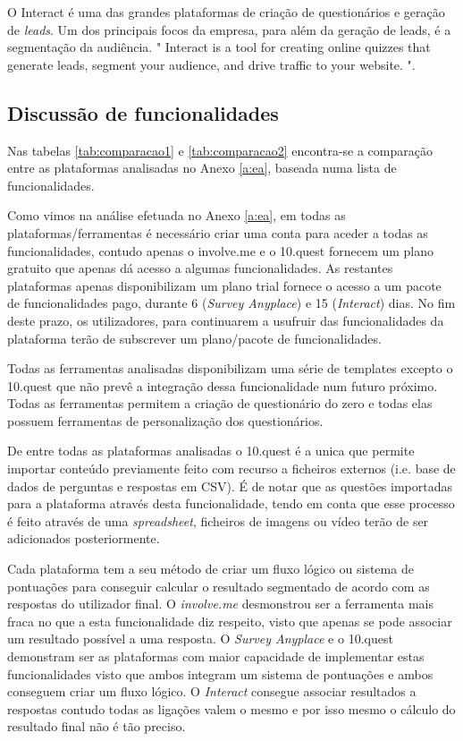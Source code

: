 O Interact é uma das grandes plataformas de criação de questionários e geração de \textit{leads}. Um dos principais focos da empresa, para além da geração de leads, é a segmentação da audiência. " Interact is a tool for creating online quizzes that generate leads, segment your audience, and drive traffic to your website. "\cite{interact}.


\subsection{Discussão de funcionalidades}
\label{comparacao}

Nas tabelas \ref{tab:comparacao1} e \ref{tab:comparacao2}  encontra-se a comparação entre as plataformas analisadas no Anexo \ref{a:ea}, baseada numa lista de funcionalidades.

Como vimos na análise efetuada no Anexo \ref{a:ea}, em todas as plataformas/ferramentas é necessário criar uma conta para aceder a todas as funcionalidades, contudo apenas o involve.me e o 10.quest fornecem um plano gratuito que apenas dá acesso a algumas funcionalidades. As restantes plataformas apenas disponibilizam um plano trial fornece o acesso a um pacote de funcionalidades pago, durante 6 (\textit{Survey Anyplace}) e 15 (\textit{Interact}) dias. No fim deste prazo, os utilizadores, para continuarem a usufruir das funcionalidades da plataforma terão de subscrever um plano/pacote de funcionalidades.

Todas as ferramentas analisadas disponibilizam uma série de templates excepto o 10.quest que não prevê a integração dessa funcionalidade num futuro próximo. Todas as ferramentas permitem a criação de questionário do zero e todas elas possuem ferramentas de personalização dos questionários.

De entre todas as plataformas analisadas o 10.quest é a unica que permite importar conteúdo previamente feito com recurso a ficheiros externos (i.e. base de dados de perguntas e respostas em CSV). É de notar que as questões importadas para a plataforma através desta funcionalidade, tendo em conta que esse processo é feito através de uma \textit{spreadsheet}, ficheiros de imagens ou vídeo terão de ser adicionados posteriormente.

Cada plataforma tem a seu método de criar um fluxo lógico ou sistema de pontuações para conseguir calcular o resultado segmentado de acordo com as respostas do utilizador final. O \textit{involve.me} desmonstrou ser a ferramenta mais fraca no que a esta funcionalidade diz respeito, visto que apenas se pode associar um resultado possível a uma resposta. O \textit{Survey Anyplace} e o 10.quest demonstram ser as plataformas com maior capacidade de implementar estas funcionalidades visto que ambos integram um sistema de pontuações e ambos conseguem criar um fluxo lógico. O \textit{Interact} consegue associar resultados a respostas contudo todas as ligações valem o mesmo e por isso mesmo o cálculo do resultado final não é tão preciso.

